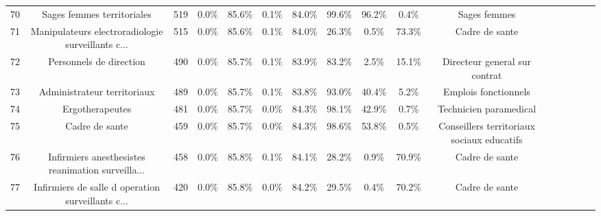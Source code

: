 \documentclass[10pt]{article}
\begin{document}
\begin{landscape}
\begin{longtable}{ | p{0.5cm} |*{15}{c|} }
70  &                         Sages femmes territoriales &            519 &           0.0\% &                  85.6\% &                 0.1\% &                    84.0\% &              99.6\% &                             96.2\% &                                     0.4\% &                                       Sages femmes \\
71  &  Manipulateurs electroradiologie surveillants c... &            515 &           0.0\% &                  85.6\% &                 0.1\% &                    84.0\% &              26.3\% &                              0.5\% &                                    73.3\% &                                     Cadre de sante \\
72  &                            Personnels de direction &            490 &           0.0\% &                  85.7\% &                 0.1\% &                    83.9\% &              83.2\% &                              2.5\% &                                    15.1\% &                      Directeur general sur contrat \\
73  &                        Administrateur territoriaux &            489 &           0.0\% &                  85.7\% &                 0.1\% &                    83.8\% &              93.0\% &                             40.4\% &                                     5.2\% &                               Emplois fonctionnels \\
74  &                                    Ergotherapeutes &            481 &           0.0\% &                  85.7\% &                 0.0\% &                    84.3\% &              98.1\% &                             42.9\% &                                     0.7\% &                             Technicien paramedical \\
75  &                                     Cadre de sante &            459 &           0.0\% &                  85.7\% &                 0.0\% &                    84.3\% &              98.6\% &                             53.8\% &                                     0.5\% &         Conseillers territoriaux sociaux educatifs \\
76  &  Infirmiers anesthesistes reanimation surveilla... &            458 &           0.0\% &                  85.8\% &                 0.1\% &                    84.1\% &              28.2\% &                              0.9\% &                                    70.9\% &                                     Cadre de sante \\
77  &  Infirmiers de salle d operation surveillants c... &            420 &           0.0\% &                  85.8\% &                 0.0\% &                    84.2\% &              29.5\% &                              0.4\% &                                    70.2\% &                                     Cadre de sante \\

\end{longtable}
\end{landscape}
\end{document}
